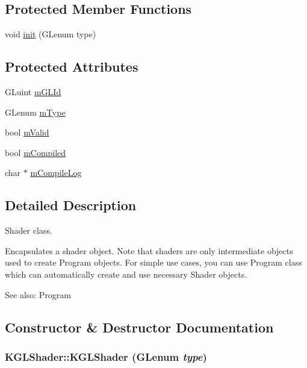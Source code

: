 \subsection*{Protected Member Functions}
\begin{CompactItemize}
\item 
void \hyperlink{class_k_g_l_shader_2c30a1d2be6fb5f4bcae597943cd71d2}{init} (GLenum type)
\end{CompactItemize}
\subsection*{Protected Attributes}
\begin{CompactItemize}
\item 
GLuint \hyperlink{class_k_g_l_shader_3d77624fd6e45291229504184035a02f}{mGLId}
\item 
GLenum \hyperlink{class_k_g_l_shader_9a748dadd159cb1982f37bb8df05ca57}{mType}
\item 
bool \hyperlink{class_k_g_l_shader_1b47e047354eeaab585f99217a509cff}{mValid}
\item 
bool \hyperlink{class_k_g_l_shader_393f2afe8e1d5bb528e3b0dfebdeec94}{mCompiled}
\item 
char $\ast$ \hyperlink{class_k_g_l_shader_f17a1dcd4b5b44e3a6acbfa5d2397c51}{mCompileLog}
\end{CompactItemize}


\subsection{Detailed Description}
Shader class. 

Encapsulates a shader object. Note that shaders are only intermediate objects used to create Program objects. For simple use cases, you can use Program class which can automatically create and use necessary Shader objects.

\begin{Desc}
\item[See also:]Program \end{Desc}


\subsection{Constructor \& Destructor Documentation}
\hypertarget{class_k_g_l_shader_d248b6b4159c8ef1c421f64f15f3a2bf}{
\subsubsection[{KGLShader}]{\setlength{\rightskip}{0pt plus 5cm}KGLShader::KGLShader (GLenum {\em type})}}
\label{class_k_g_l_shader_d248b6b4159c8ef1c421f64f15f3a2bf}


